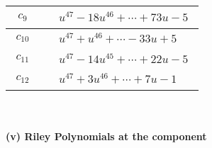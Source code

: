 \documentclass[1p]{elsarticle_modified}
\theoremstyle{definition}
\begin{document}
\begin{tabular}{m{50pt}|m{274pt}}
\hline $$\begin{aligned}c_{9}\end{aligned}$$&$\begin{aligned}
&u^{47}-18 u^{46}+\cdots+73 u-5
\end{aligned}$\\
\hline $$\begin{aligned}c_{10}\end{aligned}$$&$\begin{aligned}
&u^{47}+u^{46}+\cdots-33 u+5
\end{aligned}$\\
\hline $$\begin{aligned}c_{11}\end{aligned}$$&$\begin{aligned}
&u^{47}-14 u^{45}+\cdots+22 u-5
\end{aligned}$\\
\hline $$\begin{aligned}c_{12}\end{aligned}$$&$\begin{aligned}
&u^{47}+3 u^{46}+\cdots+7 u-1
\end{aligned}$\\
\hline
\end{tabular}\\~\\
\newpage\renewcommand{\arraystretch}{1}
\flushleft \textbf{(v) Riley Polynomials at the component}\newline \\
\end{document}
